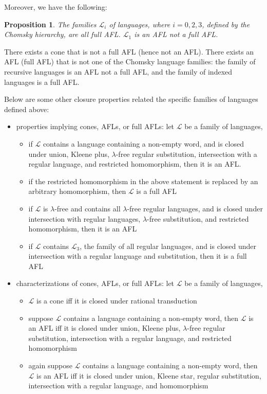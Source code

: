 \documentclass[12pt]{article}
\newtheorem{prop}{Proposition}
\begin{document}
Moreover, we have the following:
\begin{prop}  The families $\mathscr{L}_i$ of languages, where $i=0,2,3$, defined by the Chomsky hierarchy, are all full AFL.  $\mathscr{L}_1$ is an AFL not a full AFL. \end{prop}

There exists a cone that is not a full AFL (hence not an AFL).  There exists an AFL (full AFL) that is not one of the Chomsky language families: the family of recursive languages is an AFL not a full AFL, and the family of indexed languages is a full AFL.

Below are some other closure properties related the specific families of languages defined above:
\begin{itemize}
\item properties implying cones, AFLs, or full AFLs: let $\mathscr{L}$ be a family of languages,
\begin{itemize}
\item if $\mathscr{L}$ contains a language containing a non-empty word, and is closed under union, Kleene plus, $\lambda$-free regular substitution, intersection with a regular language, and restricted homomorphism, then it is an AFL.
\item if the restricted homomorphism in the above statement is replaced by an arbitrary homomorphism, then $\mathscr{L}$ is a full AFL
\item if $\mathscr{L}$ is $\lambda$-free and contains all $\lambda$-free regular languages, and is closed under intersection with regular languages, $\lambda$-free substitution, and restricted homomorphism, then it is an AFL
\item if $\mathscr{L}$ contains $\mathscr{L}_3$, the family of all regular languages, and is closed under intersection with a regular language and substitution, then it is a full AFL
\end{itemize}
\item characterizations of cones, AFLs, or full AFLs: let $\mathscr{L}$ be a family of languages,
\begin{itemize}
\item $\mathscr{L}$ is a cone iff it is closed under rational transduction
\item suppose $\mathscr{L}$ contains a language containing a non-empty word, then $\mathscr{L}$ is an AFL iff it is closed under union, Kleene plus, $\lambda$-free regular substitution, intersection with a regular language, and restricted homomorphism
\item again suppose $\mathscr{L}$ contains a language containing a non-empty word, then $\mathscr{L}$ is an AFL iff it is closed under union, Kleene star, regular substitution, intersection with a regular language, and homomorphism

\end{itemize}
\end{itemize}
\end{document}
